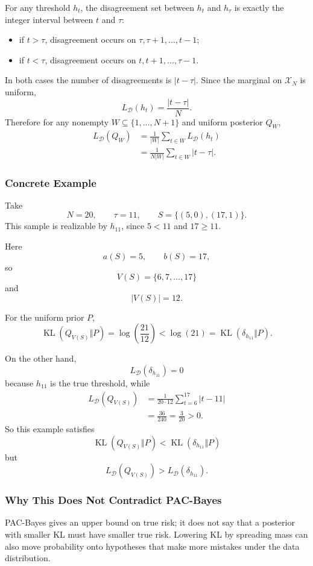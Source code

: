 \documentclass{article}
\DeclareMathOperator{\KL}{KL}
\newcommand{\cD}{\mathcal{D}}
\newcommand{\cX}{\mathcal{X}}
\begin{document}
For any threshold $h_t$, the disagreement set between $h_t$ and $h_\tau$ is exactly the integer interval between $t$ and $\tau$:
\begin{itemize}
\item if $t>\tau$, disagreement occurs on $\tau,\tau+1,\dots,t-1$;
\item if $t<\tau$, disagreement occurs on $t,t+1,\dots,\tau-1$.
\end{itemize}
In both cases the number of disagreements is $|t-\tau|$. Since the marginal on $\cX_N$ is uniform,
$$
L_{\cD}(h_t)=\frac{|t-\tau|}{N}.
$$
Therefore for any nonempty $W\subseteq\{1,\dots,N+1\}$ and uniform posterior $Q_W$,
\begin{align*}
L_{\cD}(Q_W)
&=
\frac{1}{|W|}
\sum_{t\in W} L_{\cD}(h_t) \\
&=
\frac{1}{N|W|}
\sum_{t\in W}|t-\tau|.
\end{align*}

\subsubsection{Concrete Example}

Take
$$
N=20,
\qquad
\tau=11,
\qquad
S=\{(5,0),(17,1)\}.
$$
This sample is realizable by $h_{11}$, since $5<11$ and $17\ge 11$.

Here
$$
a(S)=5,
\qquad
b(S)=17,
$$
so
$$
V(S)=\{6,7,\dots,17\}
$$
and
$$
|V(S)|=12.
$$

For the uniform prior $P$,
$$
\KL(Q_{V(S)}\Vert P)
=
\log\!\left(\frac{21}{12}\right)
<
\log(21)
=
\KL(\delta_{h_{11}}\Vert P).
$$

On the other hand,
$$
L_{\cD}(\delta_{h_{11}})=0
$$
because $h_{11}$ is the true threshold, while
\begin{align*}
L_{\cD}(Q_{V(S)})
&=
\frac{1}{20\cdot 12}
\sum_{t=6}^{17}|t-11| \\
&=
\frac{36}{240}
=
\frac{3}{20}
>
0.
\end{align*}
So this example satisfies
$$
\KL(Q_{V(S)}\Vert P) < \KL(\delta_{h_{11}}\Vert P)
$$
but
$$
L_{\cD}(Q_{V(S)}) > L_{\cD}(\delta_{h_{11}}).
$$

\subsubsection{Why This Does Not Contradict PAC-Bayes}

PAC-Bayes gives an upper bound on true risk; it does not say that a posterior with smaller KL must have smaller true risk. Lowering KL by spreading mass can also move probability onto hypotheses that make more mistakes under the data distribution.
\end{document}
